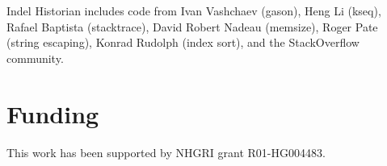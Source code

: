 \documentclass{bioinfo}
\begin{document}
Indel Historian includes code from Ivan Vashchaev (gason), Heng Li (kseq), Rafael Baptista (stacktrace), David Robert Nadeau (memsize), Roger Pate (string escaping), Konrad Rudolph (index sort), and the StackOverflow community.

\section*{Funding}

This work has been supported by NHGRI grant R01-HG004483.


%
%
%
%
%
%
%
%



\end{document}
